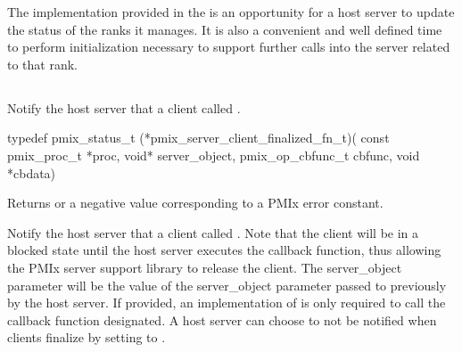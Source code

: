 \adviceimplstart
 The  implementation provided in the  is an opportunity for a host server
 to update the status of the ranks it manages.  It is also a convenient and well defined time to perform initialization necessary to
 support further calls into the server related to that rank.
 \adviceimplend

\subsection{}

\summary

Notify the host server that a client called .

\format

\cspecificstart
\begin{codepar}
typedef pmix_status_t (*pmix_server_client_finalized_fn_t)(
                             const pmix_proc_t *proc, void* server_object,
                             pmix_op_cbfunc_t cbfunc, void *cbdata)
\end{codepar}
\cspecificend

\begin{arglist}
\end{arglist}

Returns  or a negative value corresponding to a PMIx error constant.

\descr

Notify the host server that a client called .
Note that the client will be in a blocked state until the host server executes the callback function, thus allowing the PMIx server support library to release the client.
The server_object parameter will be the value of the server_object parameter passed to
 previously by the host server.  If provided, an implementation of 
is only required to
call the callback function designated.  A host server can choose to not be notified when clients finalize by setting  to .

